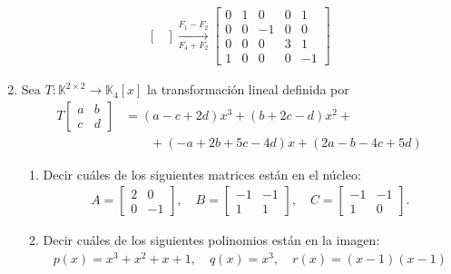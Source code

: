 \begin{enumerate}[topsep=6pt, itemsep=.4cm]
\begin{align*}
\begin{bmatrix}
        \end{bmatrix}
        \underset{F_4+F_2}{\stackrel{F_1-F_2}{\longrightarrow}}
        \begin{bmatrix}
            0 & 1 & 0 &0 &1\\
            0 & 0 & -1 &0 &0\\
            0 & 0 & 0 &3 &1\\
            1 & 0 & 0 &0 &-1
        \end{bmatrix}
    \end{align*}
    






        \item Sea $T:\mathbb{K}^{2\times 2}\longrightarrow\mathbb{K}_{4}[x]$ la transformación lineal definida por
        \begin{align*}
        T   \begin{bmatrix}  a&b\\c&d \end{bmatrix} &= (a-c+2d)x^3+(b+2c-d)x^2+ \\
        &\qquad+(-a+2b+5c-4d)x+(2a-b-4c+5d)
        \end{align*}
        \begin{enumerate}
            \item\label{tl-matrices-pol-a} Decir cuáles de los siguientes matrices están en el núcleo:
                \begin{align*}
                    A=\begin{bmatrix}
                        2&0\\0&-1
                    \end{bmatrix},
                \quad
                B=\begin{bmatrix}
                    -1&-1\\1&1
                \end{bmatrix},
                \quad
                C=\begin{bmatrix}
                    -1&-1\\1&0
                \end{bmatrix}.
                \end{align*}
            \item\label{tl-matrices-pol-b} Decir cuáles de los siguientes polinomios están en la imagen:
                \begin{align*}
                    p(x)=x^3+x^2+x+1,\quad q(x)=x^3, \quad r(x)=(x-1)(x-1) 
                \end{align*}
        \end{enumerate}
    

\end{enumerate}
